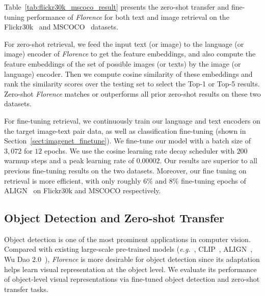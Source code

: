\documentclass{article}
\newcommand{\eg}{{\it{e.g.}~}}
\begin{document}
Table~\ref{tab:flickr30k_mscoco_result} presents the zero-shot transfer and fine-tuning performance
of \emph{Florence} for both text and image retrieval on the Flickr30k~\cite{plummer2016flickr30k}
and MSCOCO~\cite{lin2015microsoft} datasets.

For zero-shot retrieval, we feed the input text (or image) to the language (or image) encoder of
\emph{Florence} to get the feature embeddings, and also compute the feature embeddings of the set of
possible images (or texts) by the image (or language) encoder. Then we compute cosine similarity of
these embeddings and rank the similarity scores over the testing set to select the Top-1 or Top-5
results. Zero-shot \emph{Florence} matches or outperforms all prior zero-shot results on these two
datasets.

For fine-tuning retrieval, we continuously train our language and text encoders on the target
image-text pair data, as well as classification fine-tuning (shown in
Section~\ref{sect:imagenet_finetune}). We fine-tune our model with a batch size of $3,072$ for $12$
epochs. We use the cosine learning rate decay scheduler with $200$ warmup steps and a peak learning
rate of $0.00002$. Our results are superior to all previous fine-tuning results on the two
datasets. Moreover, our fine tuning on retrieval is more efficient, with only roughly $6\%$ and $8\%$ fine-tuning epochs of ALIGN~\cite{jia2021scaling} on Flickr30k and MSCOCO respectively.


\subsection{Object Detection and Zero-shot Transfer}

Object detection is one of the most prominent applications in computer vision. Compared with
existing large-scale pre-trained models (\eg, CLIP~\cite{radford2021learning},
ALIGN~\cite{jia2021scaling}, Wu Dao 2.0~\cite{Wudao2}), \emph{Florence} is more desirable for object
detection since its adaptation helps learn visual representation at the object level.  We evaluate
its performance of object-level visual representations via fine-tuned object
detection and zero-shot transfer tasks.
\end{document}
